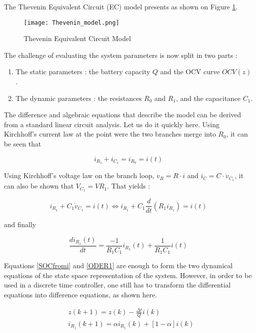 \documentclass{article}
\begin{document}
The Thevenin Equivalent Circuit (EC) model presents as shown on Figure \ref{fig:Thevenin_model}.

\begin{figure}[h]
    \centering
    \texttt{[image: Thevenin\_model.png]}
    \caption{Thevenin Equivalent Circuit Model}
    \label{fig:Thevenin_model}
\end{figure}

The challenge of evaluating the system parameters is now split in two parts :

\begin{enumerate}
\item The static parameters : the battery capacity $Q$ and the OCV curve $OCV(z)$.
\item The dynamic parameters : the resistances $R_0 $ and $R_1$, and the capacitance $C_1$.
\end{enumerate}

The difference and algebraic equations that describe the model can be derived from a standard linear circuit analysis. Let us do it quickly here. 
Using Kirchhoff's current law at the point were the two branches merge into $R_0$, it can be seen that

\begin{equation}
i_{R_1} + i_{C_1} = i_{R_0} = i(t)
\end{equation} 

\noindent Using Kirchhoff's voltage law on the branch loop, $v_R = R \cdot i$ and $i_C = C \cdot \dot{v}_{C_1}$, it can also be shown that $ V_{C_1} = V{R_1}$. That yields :

\begin{equation}
	i_{R_1} + C_1 \dot{v}_{C_1} = i(t) \Leftrightarrow i_{R_1} + C_1 \frac{d}{dt}(R_1 i_{R_1}) = i(t)
\end{equation}

\noindent and finally 

\begin{equation}
\frac{di_{R_1}(t)}{dt} = \frac{-1}{R_1 C_1}i_{R_1}(t) + \frac{1}{R_1 C_1} i(t)
\label{ODER1}
\end{equation}

Equations \eqref{SOCfromi} and \eqref{ODER1} are enough to form the two dynamical equations of the state space representation of the system. However, in order to be used in a discrete time controller, one still has to transform the differential equations into difference equations, as shown here. 

\begin{align}
 & z(k+1) = z(k) - \frac{\Delta t}{Q} i(k) \\
 & i_{R_1} (k+1) = \alpha i_{R_1} (k) + [1 - \alpha ] i(k) 
\end{align}
\end{document}
